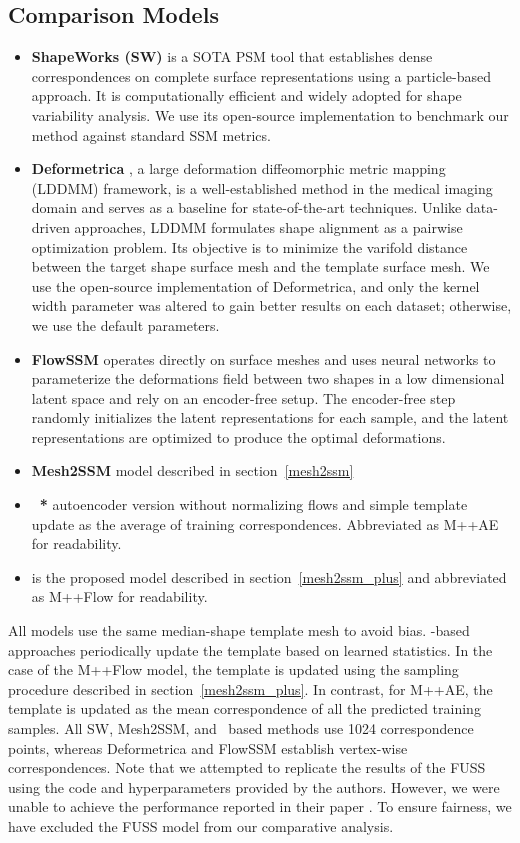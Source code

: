\subsection{Comparison Models}
\begin{itemize}
\item \textbf{ShapeWorks (SW)} \cite{cates2017shapeworks} is a SOTA PSM tool that establishes dense correspondences on complete surface representations using a particle-based approach. It is computationally efficient and widely adopted for shape variability analysis. We use its open-source implementation to benchmark our method against standard SSM metrics.
\item \textbf{Deformetrica} \cite{durrleman2014morphometry}, a large deformation diffeomorphic metric mapping (LDDMM) framework, is a well-established method in the medical imaging domain and serves as a baseline for state-of-the-art techniques. Unlike data-driven approaches, LDDMM formulates shape alignment as a pairwise optimization problem. Its objective is to minimize the varifold distance between the target shape surface mesh and the template surface mesh. We use the open-source implementation of Deformetrica, and only the kernel width parameter was altered to gain better results on each dataset; otherwise, we use the default parameters.
\item \textbf{FlowSSM} \cite{ludke2022landmark} operates directly on surface meshes and uses neural networks to parameterize the deformations field between two shapes in a low dimensional latent space and rely on an encoder-free setup. The encoder-free step randomly initializes the latent representations for each sample, and the latent representations are optimized to produce the optimal deformations.
\item \textbf{Mesh2SSM} \cite{iyer2023mesh2ssm} model described in section~\ref{mesh2ssm}
\item \textbf{\model~*} autoencoder version without normalizing flows and simple template update as the average of training correspondences. Abbreviated as M++AE for readability. 
\item \textbf{\model} is the proposed model described in section~\ref{mesh2ssm_plus} and abbreviated as M++Flow for readability. 
\end{itemize}
All models use the same median-shape template mesh to avoid bias. \model-based approaches periodically update the template based on learned statistics. In the case of the M++Flow model, the template is updated using the sampling procedure described in section~\ref{mesh2ssm_plus}. In contrast, for M++AE, the template is updated as the mean correspondence of all the predicted training samples. All SW, Mesh2SSM, and \model~based methods use 1024 correspondence points, whereas Deformetrica and FlowSSM establish vertex-wise correspondences. Note that we attempted to replicate the results of the FUSS \cite{el2024universal} using the code and hyperparameters provided by the authors. However, we were unable to achieve the performance reported in their paper \cite{el2024universal}. To ensure fairness, we have excluded the FUSS model from our comparative analysis.
